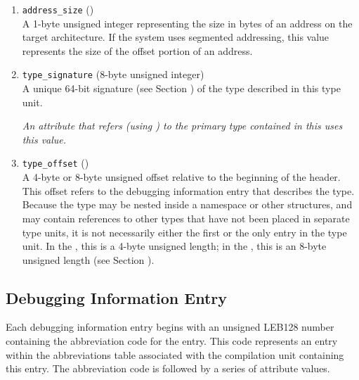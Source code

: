 \begin{enumerate}[1. ]
\item \texttt{address\_size} (\HFTubyte) \\
A 1-byte unsigned integer representing the size 
in bytes of
an address on the target architecture. If the system uses
segmented addressing, this value represents the size of the
offset portion of an address.

\item \texttt{type\_signature} (8-byte unsigned integer) \\
A unique 64-bit signature (see Section 
)
of the type described in this type
unit.  

\textit{An attribute that refers (using 
\DWFORMrefsigeight{}) to
the primary type contained in this 
 uses this value.}

\item \texttt{type\_offset} () \\
A 4-byte or 8-byte unsigned offset 
relative to the beginning
of the  header.
This offset refers to the debugging
information entry that describes the type. Because the type
may be nested inside a namespace or other structures, and may
contain references to other types that have not been placed in
separate type units, it is not necessarily either the first or
the only entry in the type unit. In the \thirtytwobitdwarfformat,
this is a 4-byte unsigned length; in the \sixtyfourbitdwarfformat,
this is an 8-byte unsigned length
(see Section ).

\end{enumerate}

\subsection{Debugging Information Entry}
\label{datarep:debugginginformationentry}

Each debugging information entry begins with an 
unsigned LEB128
number containing the abbreviation code for the entry. This
code represents an entry within the abbreviations table
associated with the compilation unit containing this entry. The
abbreviation code is followed by a series of attribute values.

